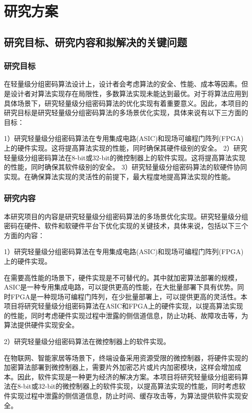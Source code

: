 \documentclass{ctexart}
\begin{document}
\section{研究方案}
\subsection{研究目标、研究内容和拟解决的关键问题}
\subsubsection{研究目标}
在轻量级分组密码算法设计上，设计者会考虑算法的安全、性能、成本等因素。但是设计者对算法实现存在局限性，多数算法实现未能达到最优。对于将算法应用到具体场景下，研究轻量级分组密码算法的优化实现有着重要意义。因此，本项目的研究目标是研究轻量级分组密码算法的多场景优化实现，具体来说有以下三方面的目标：

1）研究轻量级分组密码算法在专用集成电路(ASIC)和现场可编程门阵列(FPGA)上的硬件实现。这将提高算法实现的性能，同时确保其硬件级别的安全。
2）研究轻量级分组密码算法在8-bit或32-bit的微控制器上的软件实现。这将提高算法实现的性能，同时确保其软件级别的安全。
3）研究轻量级分组密码算法的软硬件协同实现。在确保算法实现的灵活性的前提下，最大程度地提高算法实现的性能。

\subsubsection{研究内容}

本研究项目的内容是研究轻量级分组密码算法的多场景优化实现。研究轻量级分组密码在硬件、软件和软硬件平台下优化实现的关键技术，具体来说，包括以下三个方面的内容：

1）研究轻量级分组密码算法在专用集成电路(ASIC)和现场可编程门阵列(FPGA)上的硬件实现。

在需要高性能的场景下，硬件实现是不可替代的。其中就加密算法部署的规模，ASIC是一种专用集成电路，可以提供更高的性能，在大批量部署下具有优势。同时FPGA是一种现场可编程门阵列，在少批量部署上，可以提供更高的灵活性。本项目将研究轻量级分组密码算法在ASIC和FPGA上的硬件实现，以提高算法实现的性能，同时考虑硬件实现过程中泄露的侧信道信息，防止功耗、故障攻击等，为算法提供硬件实现安全。

2）研究轻量级分组密码算法在微控制器上的软件实现。

在物联网、智能家居等场景下，终端设备采用资源受限的微控制器，将硬件实现的加密算法部署到微控制器上，需要片外加密芯片或片内加密模块，这样会增加成本。因此，软件实现是一种更为经济的解决方案。本项目将研究轻量级分组密码算法在8-bit或32-bit的微控制器上的软件实现，以提高算法实现的性能，同时考虑软件实现过程中泄露的侧信道信息，防止时间、缓存攻击等，为算法提供软件实现安全。
\end{document}
